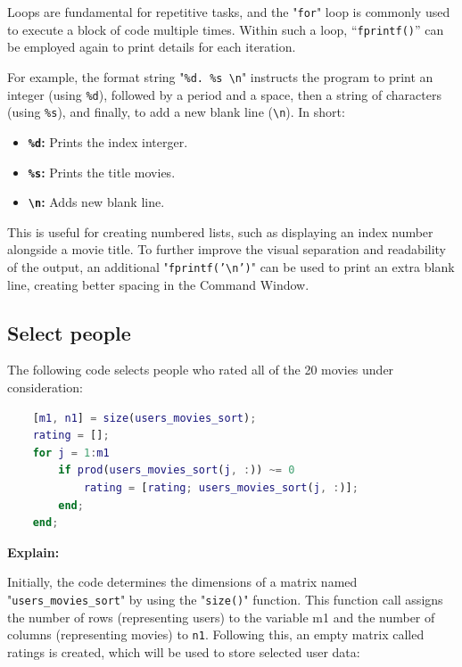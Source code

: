Loops are fundamental for repetitive tasks, and the "\texttt{for}" loop is commonly used to execute a block of code multiple times. Within such a loop, “\texttt{fprintf()}” can be employed again to print details for each iteration.

For example, the format string "\texttt{\%d. \%s \textbackslash n}" instructs the program to print an integer (using \texttt{\%d}), followed by a period and a space, then a string of characters (using \texttt{\%s}), and finally, to add a new blank line (\texttt{\textbackslash n}). In short:

\begin{itemize}[label=-]
	\item \textbf{\texttt{\%d}:} Prints the index interger.
	\item \textbf{\texttt{\%s}:} Prints the title movies.
	\item \textbf{\texttt{\textbackslash n}:} Adds new blank line.
\end{itemize}

This is useful for creating numbered lists, such as displaying an index number alongside a movie title. To further improve the visual separation and readability of the output, an additional "\texttt{{fprintf('\textbackslash n')}}" can be used to print an extra blank line, creating better spacing in the Command Window.

\subsection{Select people}

The following code selects people who rated all of the 20 movies under consideration:

\begin{lstlisting}[style=StyleCode, language=MATLAB]
	% Select the users to compare to 
	[m1, n1] = size(users_movies_sort);
	rating = [];
	for j = 1:m1
		if prod(users_movies_sort(j, :)) ~= 0
			rating = [rating; users_movies_sort(j, :)];
		end;
	end;
\end{lstlisting}

\textbf{Explain:}

Initially, the code determines the dimensions of a matrix named "\texttt{users\_movies\_sort}" by using the "\texttt{size()}" function. This function call assigns the number of rows (representing users) to the variable m1 and the number of columns (representing movies) to \texttt{n1}. Following this, an empty matrix called ratings is created, which will be used to store selected user data:

